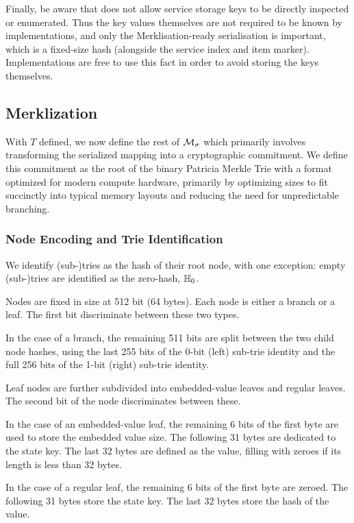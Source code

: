 Finally, be aware that \Jam does not allow service storage keys to be directly inspected or enumerated. Thus the key values themselves are not required to be known by implementations, and only the Merklisation-ready serialisation is important, which is a fixed-size hash (alongside the service index and item marker). Implementations are free to use this fact in order to avoid storing the keys themselves.

\subsection{Merklization}

With $T$ defined, we now define the rest of $\mathcal{M}_\sigma$ which primarily involves transforming the serialized mapping into a cryptographic commitment. We define this commitment as the root of the binary Patricia Merkle Trie with a format optimized for modern compute hardware, primarily by optimizing sizes to fit succinctly into typical memory layouts and reducing the need for unpredictable branching.

\subsubsection{Node Encoding and Trie Identification}
We identify (sub-)tries as the hash of their root node, with one exception: empty (sub-)tries are identified as the zero-hash, $\mathbb{H}_{0}$.

Nodes are fixed in size at 512 bit (64 bytes). Each node is either a branch or a leaf. The first bit discriminate between these two types.

In the case of a branch, the remaining 511 bits are split between the two child node hashes, using the last 255 bits of the 0-bit (left) sub-trie identity and the full 256 bits of the 1-bit (right) sub-trie identity.

Leaf nodes are further subdivided into embedded-value leaves and regular leaves. The second bit of the node discriminates between these.

In the case of an embedded-value leaf, the remaining 6 bits of the first byte are used to store the embedded value size. The following 31 bytes are dedicated to the state key. The last 32 bytes are defined as the value, filling with zeroes if its length is less than 32 bytes.

In the case of a regular leaf, the remaining 6 bits of the first byte are zeroed. The following 31 bytes store the state key. The last 32 bytes store the hash of the value.

